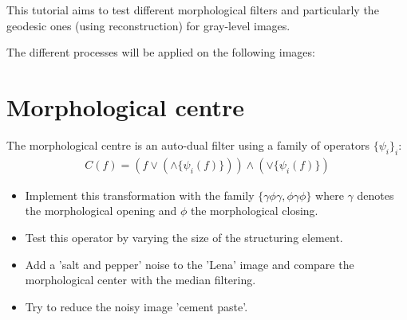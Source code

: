 \def\difficulty{3}
\begin{note}This tutorial aims to test different morphological filters and particularly the geodesic ones (using reconstruction) for gray-level images.
\end{note}


\noindent The different processes will be applied on the following images:
{
	\makeatletter
	\renewcommand\fs@ruled{\def\@fs@cfont{\bfseries}\let\@fs@capt\floatc@ruled
		\def\@fs@pre{\hrule height.8pt depth0pt \kern2pt}%
		\def\@fs@post{\kern2pt\hrule\relax}%
		\def\@fs@mid{\vskip2pt}%
		\let\@fs@iftopcapt\iftrue}
	\makeatother
\begin{figure}[htbp]
\centering
{}\hspace*{1cm}
\end{figure}
}


\section{Morphological centre}
The morphological centre is an auto-dual filter using a family of operators $\{\psi_i\}_i$:
\begin{eqnarray}
C(f)=(f \vee (\wedge\{\psi_i(f)\})) \wedge (\vee\{\psi_i(f)\})
\end{eqnarray}
\begin{qbox}
\begin{itemize}
	\item Implement this transformation with the family $\{\gamma\phi\gamma, \phi\gamma\phi\}$ where $\gamma$ denotes the morphological opening and $\phi$ the morphological closing.
	\item Test this operator by varying the size of the structuring element.
	\item Add a 'salt and pepper' noise to the 'Lena' image and compare the morphological center with the median filtering.
	\item Try to reduce the noisy image 'cement paste'.
\end{itemize}
\end{qbox}

